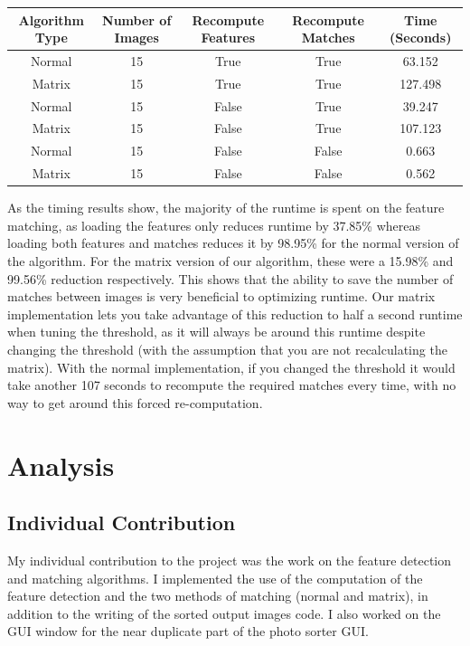 \documentclass[12pt]{article}
\begin{document}
	\begin{table}[H]
	\begin{adjustbox}{width=\columnwidth,center}
		\begin{tabular}{|c|c|c|c|c|}
			\hline
			\textbf{Algorithm Type} & 	\textbf{Number of Images} & 	\textbf{Recompute Features} & 	\textbf{Recompute Matches} & 	\textbf{Time (Seconds)} \\ \hline
			Normal & 15 & True & True & 63.152 \\ \hline
			Matrix & 15 & True & True & 127.498 \\ \hline
			Normal & 15 & False & True & 39.247 \\ \hline
			Matrix & 15 & False & True & 107.123 \\ \hline
			Normal & 15 & False & False & 0.663 \\ \hline
			Matrix & 15 & False & False & 0.562 \\ \hline
		\end{tabular}
	\end{adjustbox}
	\end{table}


	As the timing results show, the majority of the runtime is spent on the feature matching, as loading the features only reduces runtime by 37.85\% whereas loading both features and matches reduces it by 98.95\% for the normal version of the algorithm. For the matrix version of our algorithm, these were a 15.98\% and 99.56\% reduction respectively. This shows that the ability to save the number of matches between images is very beneficial to optimizing runtime. Our matrix implementation lets you take advantage of this reduction to half a second runtime when tuning the threshold, as it will always be around this runtime despite changing the threshold (with the assumption that you are not recalculating the matrix). With the normal implementation, if you changed the threshold it would take another 107 seconds to recompute the required matches every time, with no way to get around this forced re-computation.


\section{Analysis}

\subsection{Individual Contribution}
	My individual contribution to the project was the work on the feature detection and matching algorithms. I implemented the use of the computation of the feature detection and the two methods of matching (normal and matrix), in addition to the writing of the sorted output images code. I also worked on the GUI window for the near duplicate part of the photo sorter GUI.
\end{document}
